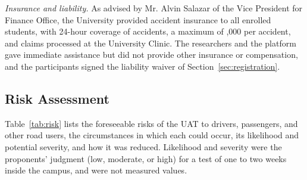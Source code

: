 \textit{Insurance and liability.} As advised by Mr. Alvin Salazar of the Vice President for Finance Office, the University provided accident insurance to all enrolled students, with 24-hour coverage of accidents, a maximum of ,000 per accident, and claims processed at the University Clinic. The researchers and the platform gave immediate assistance but did not provide other insurance or compensation, and the participants signed the liability waiver of Section~\ref{sec:registration}.

\subsection[Risk Assessment]{Risk Assessment}\label{sec:risk}
Table~\ref{tab:risk} lists the foreseeable risks of the UAT to drivers, passengers, and other road users, the circumstances in which each could occur, its likelihood and potential severity, and how it was reduced. Likelihood and severity were the proponents' judgment (low, moderate, or high) for a test of one to two weeks inside the campus, and were not measured values.

